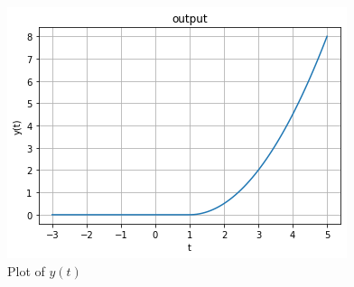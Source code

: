 \begin{figure}[!h]
 \centering
 \includegraphics[width=\columnwidth]{solutions/ec/2013/8/figures/GateAssignment1(3).png}
 \caption{Plot of $y(t)$}
 \label{ec/2013/8plot3}
\end{figure}



